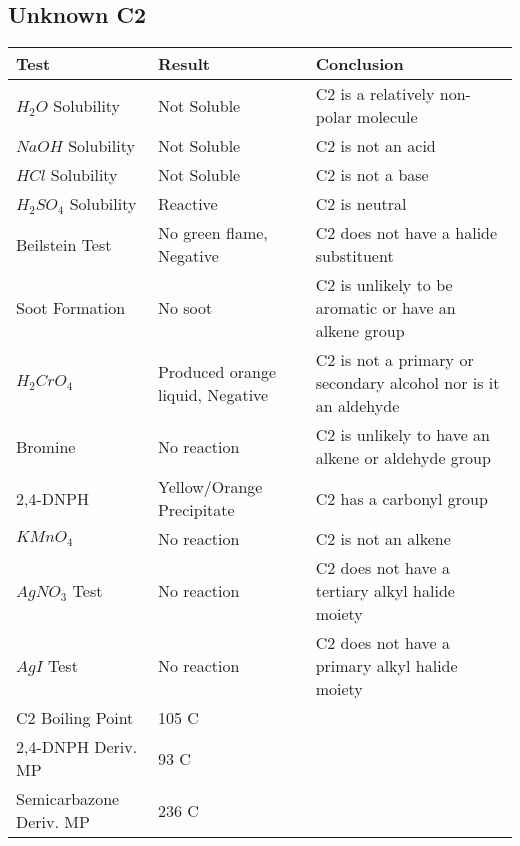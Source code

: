 \documentclass{article}
\begin{document}
	\subsection{Unknown C2}
	\begin{table}[h]
		
		\begin{tabular}{ l  p{3.0cm} p{5.4cm} } 
			\toprule
			\textbf{Test} & \textbf{Result} & \textbf{Conclusion} \\\midrule
			
			$H_2O$ Solubility & Not Soluble & C2 is a relatively non-polar molecule \\\hline
			
			$NaOH$ Solubility & Not Soluble & C2 is not an acid \\\hline
			
			$HCl$ Solubility & Not Soluble & C2 is not a base  \\\hline
			
			$H_2SO_4$ Solubility & Reactive & C2 is neutral \\\hline
			
			Beilstein Test & No green flame, Negative & C2 does not have a halide substituent \\\hline
			
			Soot Formation & No soot & C2 is unlikely to be aromatic or have an alkene group \\\hline
			
			$H_2CrO_4$ & Produced orange liquid, Negative & C2 is not a primary or secondary alcohol nor is it an aldehyde \\\hline
			
			Bromine & No reaction & C2 is unlikely to have an alkene or aldehyde group \\\hline 
			
			2,4-DNPH & Yellow/Orange Precipitate & C2 has a carbonyl group \\\hline 
			
			$KMnO_4$ & No reaction & C2 is not an alkene \\\hline  
			
			$AgNO_3$ Test & No reaction & C2 does not have a tertiary alkyl halide moiety \\\hline 
			
			$AgI$ Test & No reaction & C2 does not have a primary alkyl halide moiety \\\hline 
			
			C2 Boiling Point & 105 C &  \\\hline
			
			2,4-DNPH Deriv. MP & 93 C &  \\\hline
			
			Semicarbazone Deriv. MP & 236 C &  \\\hline
			
			
			
		\end{tabular}
	\end{table}
	\pagebreak
\end{document}
